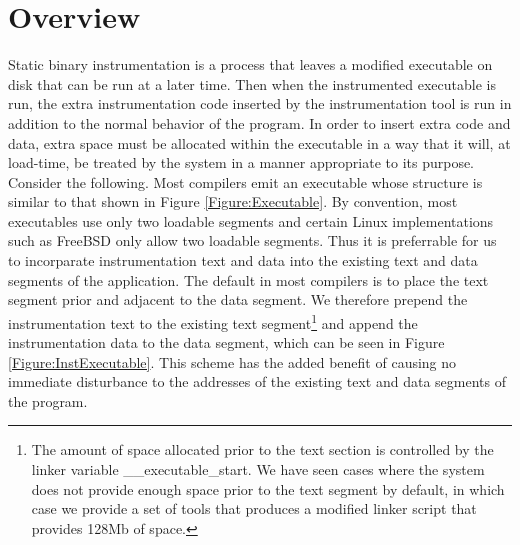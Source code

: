 \section{Overview}

Static binary instrumentation is a process that leaves a modified executable on
disk that can be run at a later time. Then when the instrumented executable is
run, the extra instrumentation code inserted by the instrumentation tool is run
in addition to the normal behavior of the program. In order to insert extra code
and data, extra space must be allocated within the executable in a way that it
will, at load-time, be treated by the system in a manner appropriate to its
purpose. Consider the following. Most compilers emit an executable whose
structure is similar to that shown in Figure \ref{Figure:Executable}. By
convention, most executables use only two loadable segments and certain Linux
implementations such as FreeBSD only allow two loadable segments. Thus it is
preferrable for us to incorparate instrumentation text and data into the
existing text and data segments of the application. The default in most
compilers is to place the text segment prior and adjacent to the data segment.
We therefore prepend the instrumentation text to the existing text
segment\footnote{The amount of space allocated prior to the text section is
controlled by the linker variable \_\_executable\_start. We have seen cases
where the system does not provide enough space prior to the text segment by
default, in which case we provide a set of tools that produces a modified linker
script that provides 128Mb of space.} and append the instrumentation data to the
data segment, which can be seen in Figure \ref{Figure:InstExecutable}. This
scheme has the added benefit of causing no immediate disturbance to the
addresses of the existing text and data segments of the program.

